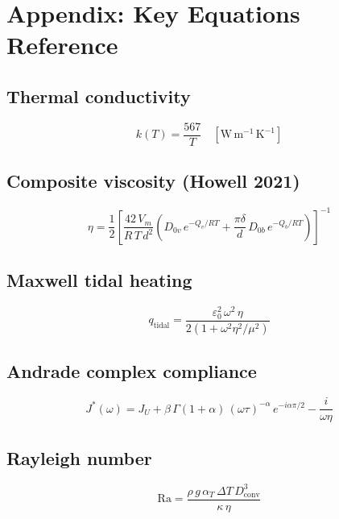 \documentclass[11pt,a4paper]{article}
\begin{document}
\section{Appendix: Key Equations Reference}

\subsection{Thermal conductivity}
\begin{equation}
k(T) = \frac{567}{T} \quad [\mathrm{W\,m^{-1}\,K^{-1}}]
\end{equation}

\subsection{Composite viscosity (Howell 2021)}
\begin{equation}
\eta = \frac{1}{2}\left[
  \frac{42\, V_m}{R\, T\, d^2}
  \left(
    D_{0v}\,e^{-Q_v/RT}
    + \frac{\pi\delta}{d}\,D_{0b}\,e^{-Q_b/RT}
  \right)
\right]^{-1}
\end{equation}

\subsection{Maxwell tidal heating}
\begin{equation}
q_\mathrm{tidal} = \frac{\varepsilon_0^2\,\omega^2\,\eta}
  {2\left(1 + \omega^2\eta^2/\mu^2\right)}
\end{equation}

\subsection{Andrade complex compliance}
\begin{equation}
J^*(\omega) = J_U + \beta\,\Gamma(1+\alpha)\,(\omega\tau)^{-\alpha}\,e^{-i\alpha\pi/2}
  - \frac{i}{\omega\eta}
\end{equation}

\subsection{Rayleigh number}
\begin{equation}
\mathrm{Ra} = \frac{\rho\,g\,\alpha_T\,\Delta T\,D_\mathrm{conv}^3}{\kappa\,\eta}
\end{equation}
\end{document}
